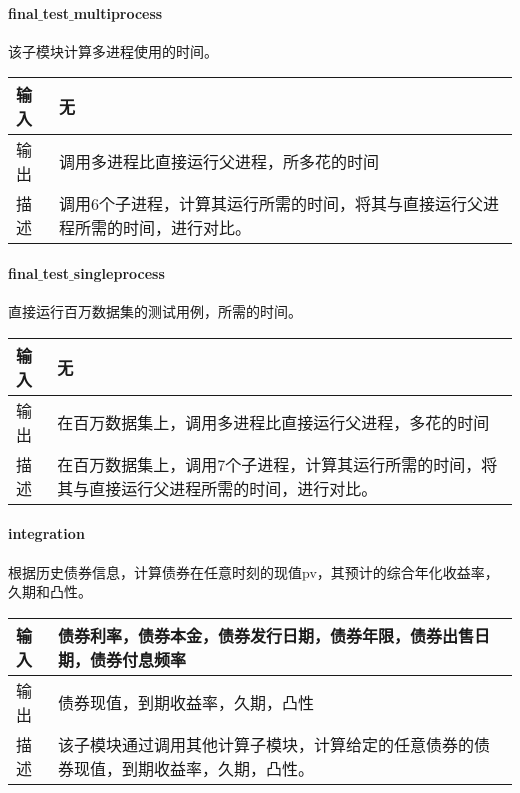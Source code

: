 \paragraph{final$\_$test$\_$multiprocess}
该子模块计算多进程使用的时间。
\begin{table}[H]
\begin{adjustwidth}{-3cm}{-3cm}
\begin{center}
\begin{tabular}{|p{}| p{}|} \hline
输入 & 无  \\ \hline
输出 & 调用多进程比直接运行父进程，所多花的时间 \\ \hline
描述 & 调用6个子进程，计算其运行所需的时间，将其与直接运行父进程所需的时间，进行对比。 \\ \hline
\end{tabular}
\end{center}
\end{adjustwidth}
\end{table}


\paragraph{final$\_$test$\_$singleprocess}
直接运行百万数据集的测试用例，所需的时间。
\begin{table}[H]
\begin{adjustwidth}{-3cm}{-3cm}
\begin{center}
\begin{tabular}{|p{}| p{}|} \hline
输入 & 无  \\ \hline
输出 & 在百万数据集上，调用多进程比直接运行父进程，多花的时间 \\ \hline
描述 & 在百万数据集上，调用7个子进程，计算其运行所需的时间，将其与直接运行父进程所需的时间，进行对比。 \\ \hline
\end{tabular}
\end{center}
\end{adjustwidth}
\end{table}


\paragraph{integration}
根据历史债券信息，计算债券在任意时刻的现值pv，其预计的综合年化收益率，久期和凸性。
\begin{table}[H]
\begin{adjustwidth}{-3cm}{-3cm}
\begin{center}
\begin{tabular}{|p{}| p{}|} \hline
输入 & 债券利率，债券本金，债券发行日期，债券年限，债券出售日期，债券付息频率  \\ \hline
输出 & 债券现值，到期收益率，久期，凸性 \\ \hline
描述 & 该子模块通过调用其他计算子模块，计算给定的任意债券的债券现值，到期收益率，久期，凸性。 \\ \hline
\end{tabular}
\end{center}
\end{adjustwidth}
\end{table}

